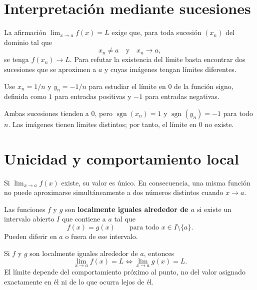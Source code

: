 \section*{Interpretación mediante sucesiones}

\begin{proposicion}
La afirmación $\lim_{x\to a}f(x)=L$ exige que, para toda sucesión $(x_n)$ del dominio tal que
\[
x_n\neq a\quad\text{y}\quad x_n\to a,
\]
se tenga $f(x_n)\to L$. Para refutar la existencia del límite basta encontrar dos sucesiones que se aproximen a $a$ y cuyas imágenes tengan límites diferentes.
\end{proposicion}

\begin{ejemplo}
Use $x_n=1/n$ y $y_n=-1/n$ para estudiar el límite en $0$ de la función signo, definida como $1$ para entradas positivas y $-1$ para entradas negativas.
\end{ejemplo}
\ifmostrarSoluciones
\begin{solucion}
Ambas sucesiones tienden a $0$, pero $\operatorname{sgn}(x_n)=1$ y $\operatorname{sgn}(y_n)=-1$ para todo $n$. Las imágenes tienen límites distintos; por tanto, el límite en $0$ no existe.
\end{solucion}
\else\vspace{13mm}\fi

\section*{Unicidad y comportamiento local}

\begin{teorema}
Si $\lim_{x\to a}f(x)$ existe, su valor es único. En consecuencia, una misma función no puede aproximarse simultáneamente a dos números distintos cuando $x\to a$.
\end{teorema}

\begin{definicion}
Las funciones $f$ y $g$ son \textbf{localmente iguales alrededor de $a$} si existe un intervalo abierto $I$ que contiene a $a$ tal que
\[
f(x)=g(x)\qquad\text{para todo }x\in I\setminus\{a\}.
\]
Pueden diferir en $a$ o fuera de ese intervalo.
\end{definicion}

\begin{proposicion}
Si $f$ y $g$ son localmente iguales alrededor de $a$, entonces
\[
\lim_{x\to a}f(x)=L\iff\lim_{x\to a}g(x)=L.
\]
El límite depende del comportamiento próximo al punto, no del valor asignado exactamente en él ni de lo que ocurra lejos de él.
\end{proposicion}

